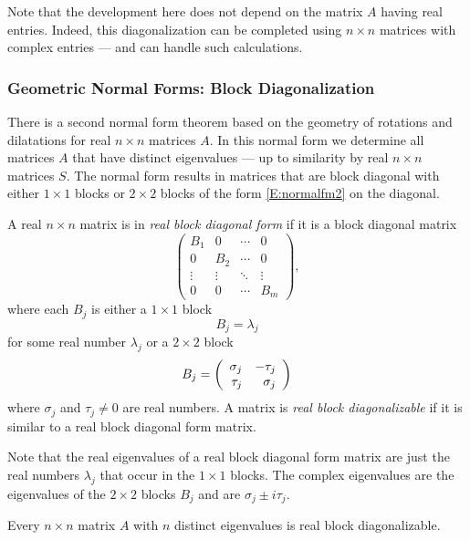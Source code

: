 \documentclass{ximera}
\begin{document}
Note that the development here does not depend on the matrix $A$ having 
real entries.  Indeed, this diagonalization can be completed using 
$n\times n$ matrices with complex entries --- and \Matlab can handle such 
calculations.


\subsubsection*{Geometric Normal Forms: Block Diagonalization}

There is a second normal form theorem based on the geometry of rotations 
and dilatations for real $n\times n$ matrices $A$.  In this normal form 
we determine all matrices $A$ that have distinct eigenvalues --- up to 
similarity by real $n\times n$ matrices $S$.  The normal form results in 
matrices that are block diagonal with either $1\times 1$ blocks or 
$2\times 2$ blocks of the form \eqref{E:normalfm2} on the diagonal.

A real $n\times n$ matrix is in 
{\em real block diagonal form\/}
if it is a block diagonal matrix
\begin{equation} \label{e:blockform}
\left(\begin{array}{cccc} B_1 & 0 & \cdots & 0 \\
	0 & B_2 & \cdots & 0\\
	\vdots & \vdots & \ddots & \vdots \\
	0 & 0 & \cdots & B_m \end{array} \right),
\end{equation}
where each $B_j$ is either a $1\times 1$ block 
\[
B_j = \lambda_j
\]
for some real number $\lambda_j$ or a $2\times 2$ block
\begin{equation} \label{e:2x2block}
B_j =   \left(\begin{array}{rr} \sigma_j & -\tau_j\\ \tau_j &\sigma_j\end{array}\right)
\end{equation}
where $\sigma_j$ and $\tau_j\neq 0$ are real numbers.  A
matrix is {\em real block diagonalizable\/} if it is 
similar to a real block diagonal form matrix.

Note that the real eigenvalues of a real block diagonal form matrix 
are just the real numbers $\lambda_j$ that occur in the $1\times 1$
blocks.  The complex eigenvalues are the eigenvalues of the
$2\times 2$ blocks $B_j$ and are $\sigma_j\pm i\tau_j$.


\begin{theorem} \label{T:Complexdiag}
Every $n\times n$ matrix $A$ with $n$ distinct eigenvalues is 
real block diagonalizable.
\end{theorem}
\end{document}
